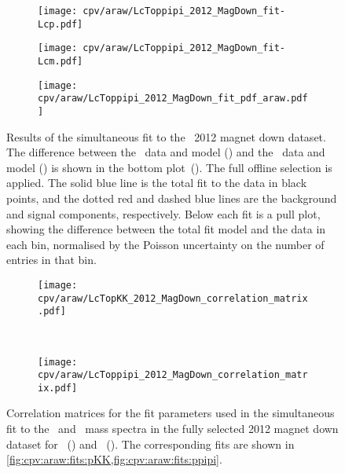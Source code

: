 \begin{figure}
  \begin{subfigure}[b]{0.5\textwidth}
    \texttt{[image: cpv/araw/LcToppipi\_2012\_MagDown\_fit-Lcp.pdf]}
    \caption{\PLambdac}
    \label{fig:cpv:araw:fits:ppipi:Lcp}
  \end{subfigure}
  \begin{subfigure}[b]{0.5\textwidth}
    \texttt{[image: cpv/araw/LcToppipi\_2012\_MagDown\_fit-Lcm.pdf]}
    \caption{\APLambdac}
    \label{fig:cpv:araw:fits:ppipi:Lcm}
  \end{subfigure}
  \begin{subfigure}[b]{0.5\textwidth}
    \texttt{[image: cpv/araw/LcToppipi\_2012\_MagDown\_fit\_pdf\_araw.pdf]}
    \caption{\ARaw}
    \label{fig:cpv:araw:fits:ppipi:ARaw}
  \end{subfigure}
  \caption{%
    Results of the simultaneous fit to the \ppipi\ 2012 magnet down dataset.
    The difference between the \PLambdac\ data and model
    () and the \APLambdac\ data and model
    () is shown in the bottom
    plot~().
    The full offline selection is applied.
    The solid blue line is the total fit to the data in black points, and the
    dotted red and dashed blue lines are the background and signal components,
    respectively.
    Below each fit is a pull plot, showing the difference between the total fit
    model and the data in each bin, normalised by the Poisson uncertainty on
    the number of entries in that bin.
  }
  \label{fig:cpv:araw:fits:ppipi}
\end{figure}

\begin{figure}
  \begin{center}
    \begin{subfigure}[b]{0.6\textwidth}
      \texttt{[image: cpv/araw/LcTopKK\_2012\_MagDown\_correlation\_matrix.pdf]}
      \caption{\pKK}
      \label{fig:cpv:araw:correlation:pKK}
    \end{subfigure}\\
    \begin{subfigure}[b]{0.6\textwidth}
      \texttt{[image: cpv/araw/LcToppipi\_2012\_MagDown\_correlation\_matrix.pdf]}
      \caption{\ppipi}
      \label{fig:cpv:araw:correlation:ppipi}
    \end{subfigure}
  \end{center}
  \caption{%
    Correlation matrices for the fit parameters used in the simultaneous fit to
    the \PLambdac\ and \APLambdac\ mass spectra in the fully selected 2012
    magnet down dataset for \pKK~() and
    \ppipi~().
    The corresponding fits are shown in
    \cref{fig:cpv:araw:fits:pKK,fig:cpv:araw:fits:ppipi}.
  }
  \label{fig:cpv:araw:correlation}
\end{figure}

